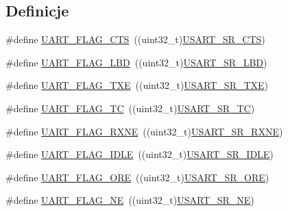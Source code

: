 \subsection*{Definicje}
\begin{DoxyCompactItemize}
\item 
\#define \hyperlink{group___u_a_r_t___flags_ga5435edd22ff23de7187654362c48e0b1}{U\+A\+R\+T\+\_\+\+F\+L\+A\+G\+\_\+\+C\+TS}~((uint32\+\_\+t)\hyperlink{group___peripheral___registers___bits___definition_ga9250ae2793db0541e6c4bb8837424541}{U\+S\+A\+R\+T\+\_\+\+S\+R\+\_\+\+C\+TS})
\item 
\#define \hyperlink{group___u_a_r_t___flags_ga8e3215245044c34b2d9a2698d93dfcd7}{U\+A\+R\+T\+\_\+\+F\+L\+A\+G\+\_\+\+L\+BD}~((uint32\+\_\+t)\hyperlink{group___peripheral___registers___bits___definition_ga5b868b59576f42421226d35628c6b628}{U\+S\+A\+R\+T\+\_\+\+S\+R\+\_\+\+L\+BD})
\item 
\#define \hyperlink{group___u_a_r_t___flags_gad39c017d415a7774c82eb07413a9dbe4}{U\+A\+R\+T\+\_\+\+F\+L\+A\+G\+\_\+\+T\+XE}~((uint32\+\_\+t)\hyperlink{group___peripheral___registers___bits___definition_ga65e9cddf0890113d405342f1d8b5b980}{U\+S\+A\+R\+T\+\_\+\+S\+R\+\_\+\+T\+XE})
\item 
\#define \hyperlink{group___u_a_r_t___flags_ga82e68a0ee4a8b987a47c66fc6f744894}{U\+A\+R\+T\+\_\+\+F\+L\+A\+G\+\_\+\+TC}~((uint32\+\_\+t)\hyperlink{group___peripheral___registers___bits___definition_ga76229b05ac37a5a688e6ba45851a29f1}{U\+S\+A\+R\+T\+\_\+\+S\+R\+\_\+\+TC})
\item 
\#define \hyperlink{group___u_a_r_t___flags_ga9d1b2860d84a87abb05c3b2fed3c108c}{U\+A\+R\+T\+\_\+\+F\+L\+A\+G\+\_\+\+R\+X\+NE}~((uint32\+\_\+t)\hyperlink{group___peripheral___registers___bits___definition_gaa0c99e2bb265b3d58a91aca7a93f7836}{U\+S\+A\+R\+T\+\_\+\+S\+R\+\_\+\+R\+X\+NE})
\item 
\#define \hyperlink{group___u_a_r_t___flags_ga5d7a320c505672f7508e3bd99f532a69}{U\+A\+R\+T\+\_\+\+F\+L\+A\+G\+\_\+\+I\+D\+LE}~((uint32\+\_\+t)\hyperlink{group___peripheral___registers___bits___definition_ga336fa8c9965ce18c10972ac80ded611f}{U\+S\+A\+R\+T\+\_\+\+S\+R\+\_\+\+I\+D\+LE})
\item 
\#define \hyperlink{group___u_a_r_t___flags_ga335a5b0f61512223bbc406b38c95b2d6}{U\+A\+R\+T\+\_\+\+F\+L\+A\+G\+\_\+\+O\+RE}~((uint32\+\_\+t)\hyperlink{group___peripheral___registers___bits___definition_ga4560fc7a60df4bdf402fc7219ae7b558}{U\+S\+A\+R\+T\+\_\+\+S\+R\+\_\+\+O\+RE})
\item 
\#define \hyperlink{group___u_a_r_t___flags_ga665981434d02ff5296361782c1a7d4b5}{U\+A\+R\+T\+\_\+\+F\+L\+A\+G\+\_\+\+NE}~((uint32\+\_\+t)\hyperlink{group___peripheral___registers___bits___definition_ga8938468c5666a8305ade6d80d467c572}{U\+S\+A\+R\+T\+\_\+\+S\+R\+\_\+\+NE})

\end{DoxyCompactItemize}
